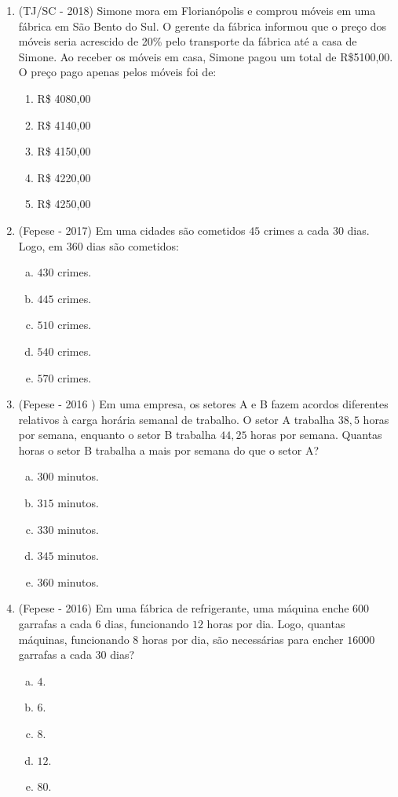 \begin{enumerate}
 \item (TJ/SC - 2018) Simone mora em Florianópolis e comprou móveis em uma fábrica em São Bento do Sul. O gerente da fábrica informou que o preço dos móveis seria acrescido de 20\% pelo transporte da fábrica até a casa de Simone.
  Ao receber os móveis em casa, Simone pagou um total de R\$5100,00. O preço pago apenas pelos móveis foi de:
  \begin{enumerate}
  \item R\$ 4080,00
  \item R\$ 4140,00
  \item R\$ 4150,00
  \item R\$ 4220,00
  \item R\$ 4250,00
 \end{enumerate}

  \item (Fepese - 2017) Em uma cidades são cometidos $45$ crimes a cada $30$ dias. Logo, em $360$ dias são cometidos:
   \begin{enumerate}[a)]
   \item $430$ crimes.
   \item $445$ crimes.
   \item $510$ crimes.
   \item $540$ crimes.
   \item $570$ crimes.
   \end{enumerate}

 \item (Fepese - 2016 ) Em uma empresa, os setores A e B fazem acordos diferentes relativos à carga horária semanal de trabalho. O setor A trabalha $38,5$ horas por semana, enquanto o setor B trabalha $44,25$ horas por semana. Quantas horas o setor B trabalha a mais por semana do que o setor A?
 \begin{enumerate}[a)]
   \item $300$ minutos.
   \item $315$ minutos.
   \item $330$ minutos.
   \item $345$ minutos.
   \item $360$ minutos.
   \end{enumerate}

 \item (Fepese - 2016) Em uma fábrica de refrigerante, uma máquina enche $600$ garrafas a cada $6$ dias, funcionando $12$ horas por dia. Logo, quantas máquinas, funcionando $8$ horas por dia, são necessárias para encher $16000$ garrafas a cada $30$ dias?
 \begin{enumerate}[a)]
   \item $4$.
   \item $6$.
   \item $8$.
   \item $12$.
   \item $80$.
   \end{enumerate}


\end{enumerate}

